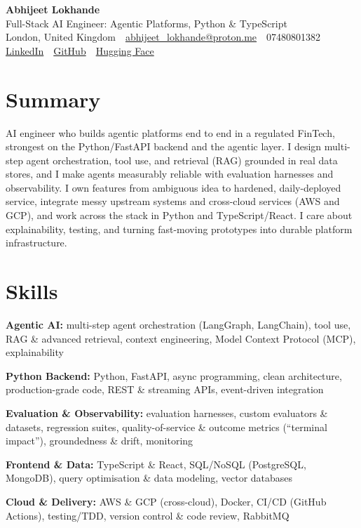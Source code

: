 \documentclass[10pt,a4paper]{article}
\newcommand{\sep}{\,\textcolor{accent!60}{\textbar}\,}
\begin{document}
\begin{center}
  {\fontsize{24}{26}\selectfont\bfseries Abhijeet Lokhande}\\[3pt]
  {\color{accent}\large Full-Stack AI Engineer: Agentic Platforms, Python \& TypeScript}\\[5pt]
  {\small
    London, United Kingdom \sep
    \href{mailto:abhijeet_lokhande@proton.me}{abhijeet\_lokhande@proton.me} \sep
    07480801382 \\[2pt]
    \href{https://www.linkedin.com/in/ablds/}{LinkedIn} \sep
    \href{https://github.com/abhijeetscode}{GitHub} \sep
    \href{https://huggingface.co/ab-ai}{Hugging Face}
  }
\end{center}
\vspace{2pt}

\section{Summary}
AI engineer who builds agentic platforms end to end in a regulated FinTech, strongest on the Python/FastAPI backend and the agentic layer. I design multi-step agent orchestration, tool use, and retrieval (RAG) grounded in real data stores, and I make agents measurably reliable with evaluation harnesses and observability. I own features from ambiguous idea to hardened, daily-deployed service, integrate messy upstream systems and cross-cloud services (AWS and GCP), and work across the stack in Python and TypeScript/React. I care about explainability, testing, and turning fast-moving prototypes into durable platform infrastructure.

\section{Skills}
\begin{tight}
  \item[\textcolor{accent}{\small$\bullet$}] \textbf{Agentic AI:} multi-step agent orchestration (LangGraph, LangChain), tool use, RAG \& advanced retrieval, context engineering, Model Context Protocol (MCP), explainability
  \item[\textcolor{accent}{\small$\bullet$}] \textbf{Python Backend:} Python, FastAPI, async programming, clean architecture, production-grade code, REST \& streaming APIs, event-driven integration
  \item[\textcolor{accent}{\small$\bullet$}] \textbf{Evaluation \& Observability:} evaluation harnesses, custom evaluators \& datasets, regression suites, quality-of-service \& outcome metrics (``terminal impact''), groundedness \& drift, monitoring
  \item[\textcolor{accent}{\small$\bullet$}] \textbf{Frontend \& Data:} TypeScript \& React, SQL/NoSQL (PostgreSQL, MongoDB), query optimisation \& data modeling, vector databases
  \item[\textcolor{accent}{\small$\bullet$}] \textbf{Cloud \& Delivery:} AWS \& GCP (cross-cloud), Docker, CI/CD (GitHub Actions), testing/TDD, version control \& code review, RabbitMQ
\end{tight}
\end{document}
